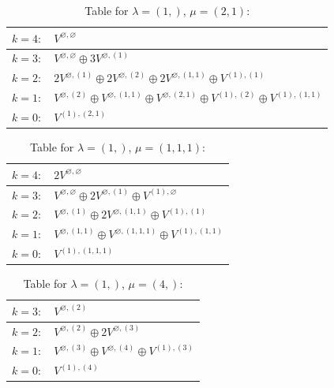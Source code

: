\documentclass[a4paper,12pt]{article}
\begin{document}
\renewcommand{\arraystretch}{1.6} 
\begin{table}[H]
\centering
\caption{Table for $\lambda = (1,)$, $\mu = (2, 1)$:}
\begin{tabular}{|>{\centering\arraybackslash}p{15cm}|}
\hline
 $k = 4: \quad V^{\varnothing, \varnothing} $ \\ \hline
 $k = 3: \quad V^{\varnothing, \varnothing} \oplus 3 V^{\varnothing, (1)} $ \\ \hline
 $k = 2: \quad 2 V^{\varnothing, (1)} \oplus 2 V^{\varnothing, (2)} \oplus 2 V^{\varnothing, (1, 1)} \oplus V^{(1), (1)} $ \\ \hline
 $k = 1: \quad V^{\varnothing, (2)} \oplus V^{\varnothing, (1, 1)} \oplus V^{\varnothing, (2, 1)} \oplus V^{(1), (2)} \oplus V^{(1), (1, 1)} $ \\ \hline
 $k = 0: \quad V^{(1), (2, 1)} $ \\ \hline
\end{tabular}
\end{table}

\renewcommand{\arraystretch}{1.6} 
\begin{table}[H]
\centering
\caption{Table for $\lambda = (1,)$, $\mu = (1, 1, 1)$:}
\begin{tabular}{|>{\centering\arraybackslash}p{15cm}|}
\hline
 $k = 4: \quad 2 V^{\varnothing, \varnothing} $ \\ \hline
 $k = 3: \quad V^{\varnothing, \varnothing} \oplus 2 V^{\varnothing, (1)} \oplus V^{(1), \varnothing} $ \\ \hline
 $k = 2: \quad V^{\varnothing, (1)} \oplus 2 V^{\varnothing, (1, 1)} \oplus V^{(1), (1)} $ \\ \hline
 $k = 1: \quad V^{\varnothing, (1, 1)} \oplus V^{\varnothing, (1, 1, 1)} \oplus V^{(1), (1, 1)} $ \\ \hline
 $k = 0: \quad V^{(1), (1, 1, 1)} $ \\ \hline
\end{tabular}
\end{table}

\renewcommand{\arraystretch}{1.6} 
\begin{table}[H]
\centering
\caption{Table for $\lambda = (1,)$, $\mu = (4,)$:}
\begin{tabular}{|>{\centering\arraybackslash}p{15cm}|}
\hline
 $k = 3: \quad V^{\varnothing, (2)} $ \\ \hline
 $k = 2: \quad V^{\varnothing, (2)} \oplus 2 V^{\varnothing, (3)} $ \\ \hline
 $k = 1: \quad V^{\varnothing, (3)} \oplus V^{\varnothing, (4)} \oplus V^{(1), (3)} $ \\ \hline
 $k = 0: \quad V^{(1), (4)} $ \\ \hline
\end{tabular}
\end{table}
\end{document}
